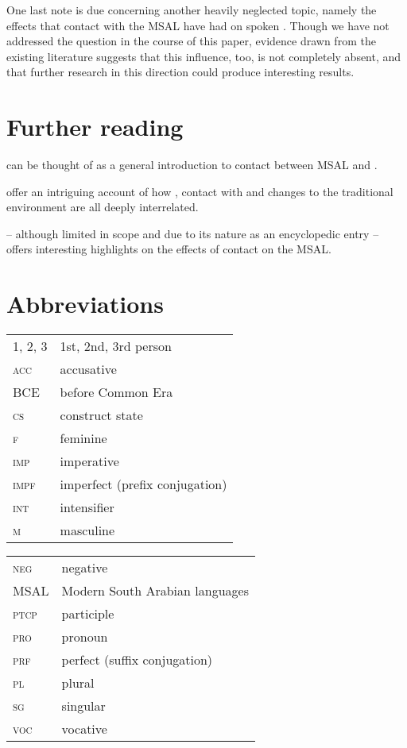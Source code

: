 \documentclass[output=paper]{langsci/langscibook}
\begin{document}
One last note is due concerning another heavily neglected topic, namely the effects that contact with the MSAL have had on spoken . Though we have not addressed the question in the course of this paper, evidence drawn from the existing literature \citep{Simeone-Senelle2002} suggests that this influence, too, is not completely absent, and that further research in this direction could produce interesting results. 

\section*{Further reading}
\begin{furtherreading}
\item[\citet{Morris2017}] can be thought of as a general introduction to contact between MSAL and . 
\item[\citet{WatsonAl-Mahri2017}] offer an intriguing account of how , contact with  and changes to the traditional environment are all deeply interrelated. 
\item[\citet{Lonnet2011}] – although limited in scope and  due to its nature as an encyclopedic entry – offers interesting highlights on the effects of contact on the MSAL.
\end{furtherreading}

\section*{Abbreviations}

\begin{tabularx}{.45\textwidth}[t]{@{}lQ@{}}
\textsc{1, 2, 3} & 1st, 2nd, 3rd person \\
\textsc{acc} & accusative \\
BCE & before Common Era \\
\textsc{cs} & construct state \\
\textsc{f} & feminine \\
\textsc{imp} & imperative \\
\textsc{impf} & imperfect (prefix conjugation) \\
\textsc{int} & intensifier \\
\textsc{m} & masculine \\
\end{tabularx}%
\begin{tabularx}{.5\textwidth}[t]{@{}lQ@{}}
\textsc{neg} & negative \\
MSAL & {Modern South Arabian} languages \\
\textsc{ptcp} & {participle} \\
\textsc{pro} & pronoun \\
\textsc{prf} & perfect (suffix conjugation) \\
\textsc{pl} & plural \\
\textsc{sg} & singular \\
\textsc{voc} & {vocative} \\
\end{tabularx}%



\sloppy
\printbibliography[heading=subbibliography,notkeyword=this]
\end{document}
